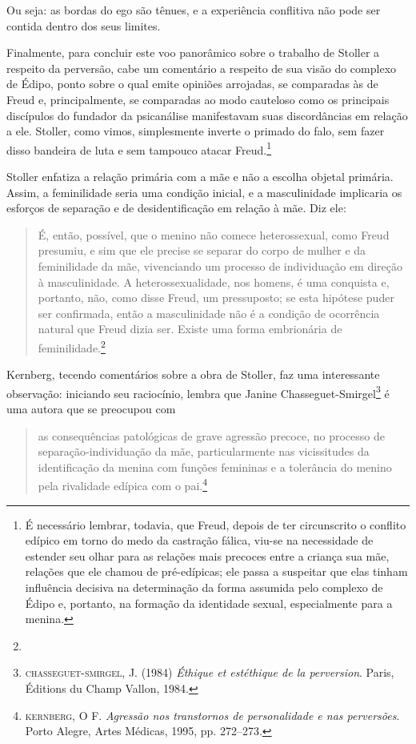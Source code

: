 Ou seja: as bordas do ego são tênues, e a experiência conflitiva não
pode ser contida dentro dos seus limites.

Finalmente, para concluir este voo panorâmico sobre o trabalho de
Stoller a respeito da perversão, cabe um comentário a respeito de sua
visão do complexo de Édipo, ponto sobre o qual emite opiniões arrojadas,
se comparadas às de Freud e, principalmente, se comparadas ao modo
cauteloso como os principais discípulos do fundador da psicanálise
manifestavam suas discordâncias em relação a ele. Stoller, como vimos,
simplesmente inverte o primado do falo, sem fazer disso bandeira de luta
e sem tampouco atacar Freud.\footnote{É necessário lembrar, todavia, que
  Freud, depois de ter circunscrito o conflito edípico em torno do medo
  da castração fálica, viu-se na necessidade de estender seu olhar para
  as relações mais precoces entre a criança sua mãe, relações que ele
  chamou de pré-edípicas; ele passa a suspeitar que elas tinham
  influência decisiva na determinação da forma assumida pelo complexo de
  Édipo e, portanto, na formação da identidade sexual, especialmente
  para a menina.}

Stoller enfatiza a relação primária com a mãe e não a escolha objetal
primária. Assim, a feminilidade seria uma condição inicial, e a
masculinidade implicaria os esforços de separação e de desidentificação
em relação à mãe. Diz ele:

\begin{quote}
É, então, possível, que o menino não comece heterossexual, como Freud
presumiu, e sim que ele precise se separar do corpo de mulher e da
feminilidade da mãe, vivenciando um processo de individuação em direção
à masculinidade. A heterossexualidade, nos homens, é uma conquista e,
portanto, não, como disse Freud, um pressuposto; se esta hipótese puder
ser confirmada, então a masculinidade não é a condição de ocorrência
natural que Freud dizia ser. Existe uma forma embrionária de
feminilidade.\footnote{}
\end{quote}

Kernberg, tecendo comentários sobre a obra de Stoller, faz uma
interessante observação: iniciando seu raciocínio, lembra que Janine
Chasseguet-Smirgel\footnote{\textsc{chasseguet-smirgel}, J. (1984)
  \emph{Éthique et estéthique de la perversion}. Paris, Éditions du
  Champ Vallon, 1984.} é uma autora que se preocupou com

\begin{quote}
as consequências patológicas de grave agressão precoce, no processo de
separação-individuação da mãe, particularmente nas vicissitudes da
identificação da menina com funções femininas e a tolerância do menino
pela rivalidade edípica com o pai.\footnote{\textsc{kernberg}, O F.
  \emph{Agressão nos transtornos de personalidade e nas perversões}.
  Porto Alegre, Artes Médicas, 1995, pp. 272--273.}
\end{quote}

